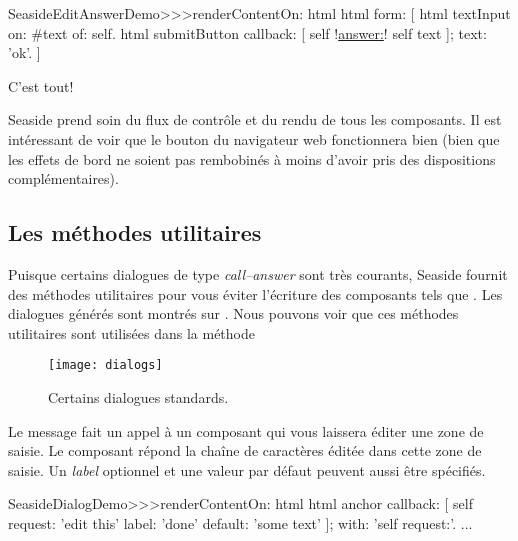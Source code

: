 \documentclass[a4paper,10pt,twoside]{book}
\begin{document}
\begin{code}{}
SeasideEditAnswerDemo>>>renderContentOn: html
	html form: [
		html textInput
			on: #text of: self.
		html submitButton
			callback: [ self !\underline{answer:}! self text ];
			text: 'ok'.
		]
\end{code}{}

\noindent{} C'est tout!

Seaside prend soin du flux de contrôle et du rendu de tous les
composants.
Il est intéressant de voir que le bouton \backbtn{} du navigateur web
fonctionnera bien (bien que les effets de bord ne soient pas
rembobinés à moins d'avoir pris des dispositions complémentaires).

\subsection{Les méthodes utilitaires}

Puisque certains dialogues de type \emph{call--answer} sont très
courants, Seaside fournit des méthodes utilitaires pour vous éviter
l'écriture des composants tels que .
Les dialogues générés sont montrés sur .
Nous pouvons voir que ces méthodes utilitaires sont utilisées dans la
méthode 

\begin{figure}[b]
\begin{center}
\texttt{[image: dialogs]}
\caption{Certains dialogues standards.}
\end{center}
\end{figure}

Le message  fait un appel à un composant
qui vous laissera éditer une zone de saisie. Le composant répond la
chaîne de caractères éditée
dans cette zone de saisie.
Un \emph{label} optionnel et une valeur par défaut peuvent aussi être
spécifiés.

\begin{code}{}
SeasideDialogDemo>>>renderContentOn: html
	html anchor
		callback: [ self request: 'edit this' label: 'done' default: 'some text' ];
		with: 'self request:'.
...
\end{code}
\end{document}
